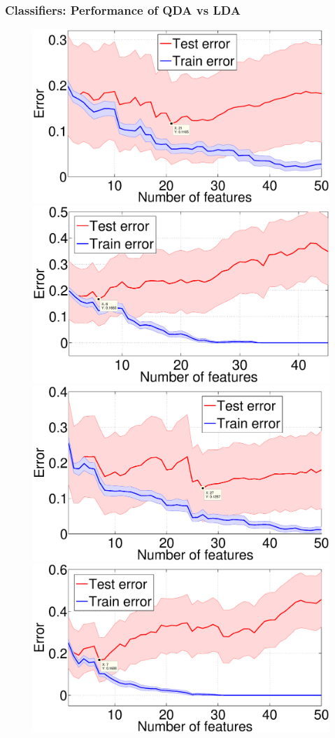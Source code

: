 \documentclass{beamer}
\begin{document}
\begin{frame}%
\frametitle{Classifiers: Performance of QDA vs LDA}
\begin{figure}
	\includegraphics[width=0.45\linewidth]{fig/class_VIS_LDA.eps}
	\includegraphics[width=0.45\linewidth]{fig/class_VIS_QDA.eps} 
	\qquad
		\includegraphics[width=0.45\linewidth]{fig/class_FES_LDA.eps}
		\includegraphics[width=0.45\linewidth]{fig/class_FES_QDA.eps}
\end{figure}
\end{frame}

\end{document}
